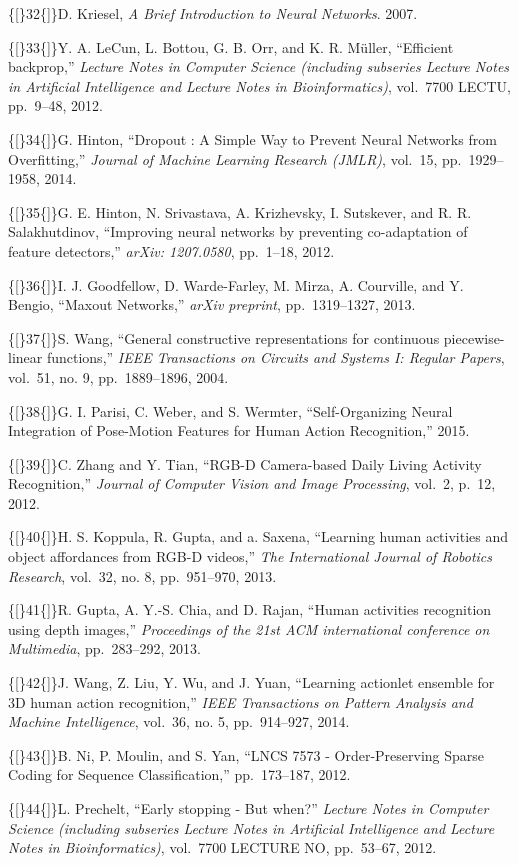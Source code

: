 \{{[}\}32\{{]}\}D. Kriesel,
\emph{A Brief Introduction to Neural Networks}. 2007.

\{{[}\}33\{{]}\}Y. A. LeCun, L. Bottou, G. B. Orr, and K. R. Müller,
``Efficient backprop,''
\emph{Lecture Notes in Computer Science (including subseries
Lecture Notes in Artificial Intelligence and Lecture Notes in
Bioinformatics)}, vol.~7700 LECTU, pp.~9--48, 2012.

\{{[}\}34\{{]}\}G. Hinton, ``Dropout : A Simple Way to Prevent Neural
Networks from Overfitting,''
\emph{Journal of Machine Learning Research (JMLR)}, vol.~15,
pp.~1929--1958, 2014.

\{{[}\}35\{{]}\}G. E. Hinton, N. Srivastava, A. Krizhevsky, I.
Sutskever, and R. R. Salakhutdinov, ``Improving neural networks by
preventing co-adaptation of feature detectors,''
\emph{arXiv: 1207.0580}, pp.~1--18, 2012.

\{{[}\}36\{{]}\}I. J. Goodfellow, D. Warde-Farley, M. Mirza, A.
Courville, and Y. Bengio, ``Maxout Networks,'' \emph{arXiv preprint},
pp.~1319--1327, 2013.

\{{[}\}37\{{]}\}S. Wang, ``General constructive representations for
continuous piecewise-linear functions,''
\emph{IEEE Transactions on Circuits and
Systems I: Regular Papers}, vol.~51, no. 9, pp.~1889--1896, 2004.

\{{[}\}38\{{]}\}G. I. Parisi, C. Weber, and S. Wermter,
``Self-Organizing Neural Integration of Pose-Motion Features for Human
Action Recognition,'' 2015.

\{{[}\}39\{{]}\}C. Zhang and Y. Tian, ``RGB-D Camera-based Daily Living
Activity Recognition,''
\emph{Journal of Computer Vision and Image Processing}, vol.~2, p.~12,
2012.

\{{[}\}40\{{]}\}H. S. Koppula, R. Gupta, and a. Saxena, ``Learning human
activities and object affordances from RGB-D videos,'' \emph{The
International Journal of Robotics Research}, vol.~32, no. 8,
pp.~951--970, 2013.

\{{[}\}41\{{]}\}R. Gupta, A. Y.-S. Chia, and D. Rajan, ``Human
activities recognition using depth images,''
\emph{Proceedings of the 21st ACM
international conference on Multimedia}, pp.~283--292, 2013.

\{{[}\}42\{{]}\}J. Wang, Z. Liu, Y. Wu, and J. Yuan, ``Learning
actionlet ensemble for 3D human action recognition,''
\emph{IEEE Transactions on
Pattern Analysis and Machine Intelligence}, vol.~36, no. 5,
pp.~914--927, 2014.

\{{[}\}43\{{]}\}B. Ni, P. Moulin, and S. Yan, ``LNCS 7573 -
Order-Preserving Sparse Coding for Sequence Classification,''
pp.~173--187, 2012.

\{{[}\}44\{{]}\}L. Prechelt, ``Early stopping - But when?''
\emph{Lecture Notes
in Computer Science (including subseries Lecture Notes in Artificial
Intelligence and Lecture Notes in Bioinformatics)}, vol.~7700 LECTURE
NO, pp.~53--67, 2012.
